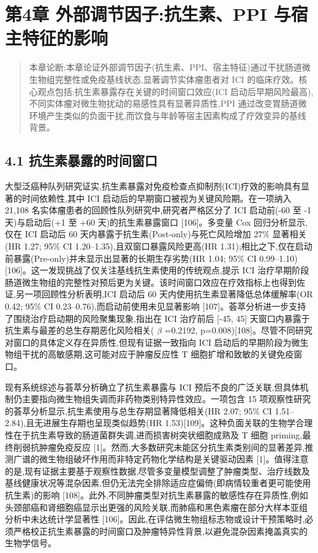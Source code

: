 \documentclass[11pt]{article}
\begin{document}
\section{第4章 外部调节因子:抗生素、PPI 与宿主特征的影响}\label{ux7b2c4ux7ae0-ux5916ux90e8ux8c03ux8282ux56e0ux5b50ux6297ux751fux7d20ppi-ux4e0eux5bbfux4e3bux7279ux5f81ux7684ux5f71ux54cd}

\begin{quote}
本章论断:本章论证外部调节因子(抗生素、PPI、宿主特征)通过干扰肠道微生物组完整性或免疫基线状态,显著调节实体瘤患者对 ICI 的临床疗效。核心观点包括:抗生素暴露存在关键的时间窗口效应(ICI 启动后早期风险最高),不同实体瘤对微生物扰动的易感性具有显著异质性,PPI 通过改变胃肠道微环境产生类似的负面干扰,而饮食与年龄等宿主因素构成了疗效变异的基线背景。
\end{quote}

\subsection{4.1 抗生素暴露的时间窗口}\label{ux6297ux751fux7d20ux66b4ux9732ux7684ux65f6ux95f4ux7a97ux53e3}

大型泛癌种队列研究证实,抗生素暴露对免疫检查点抑制剂(ICI)疗效的影响具有显著的时间依赖性,其中 ICI 启动后的早期窗口被视为关键风险期。在一项纳入 21,108 名实体瘤患者的回顾性队列研究中,研究者严格区分了 ICI 启动前(-60 至 -1 天)与启动后(+1 至 +60 天)的抗生素暴露窗口 {[}106{]}。多变量 Cox 回归分析显示,仅在 ICI 启动后 60 天内暴露于抗生素(Post-only)与死亡风险增加 27\% 显著相关(HR 1.27; 95\% CI 1.20--1.35),且双窗口暴露风险更高(HR 1.31);相比之下,仅在启动前暴露(Pre-only)并未显示出显著的长期生存劣势(HR 1.04; 95\% CI 0.99--1.10){[}106{]}。这一发现挑战了仅关注基线抗生素使用的传统观点,提示 ICI 治疗早期阶段肠道微生物组的完整性对预后更为关键。该时间窗口效应在疗效指标上也得到佐证,另一项回顾性分析表明,ICI 启动后 60 天内使用抗生素显著降低总体缓解率(OR 0.42; 95\% CI 0.23--0.76),而启动前使用未见显著影响 {[}107{]}。荟萃分析进一步支持了围绕治疗启动期的风险聚集现象,指出在 ICI 治疗前后 {[}-45, 45{]} 天窗口内暴露于抗生素与最差的总生存期恶化风险相关( \(\beta\) =0.2192, p=0.008){[}108{]}。尽管不同研究对窗口的具体定义存在异质性,但现有证据一致指向 ICI 启动后的早期阶段为微生物组干扰的高敏感期,这可能对应于肿瘤反应性 T 细胞扩增和致敏的关键免疫窗口。

现有系统综述与荟萃分析确立了抗生素暴露与 ICI 预后不良的广泛关联,但具体机制仍主要指向微生物组失调而非药物类别特异性效应。一项包含 15 项观察性研究的荟萃分析显示,抗生素使用与总生存期显著降低相关(HR 2.07; 95\% CI 1.51--2.84),且无进展生存期也呈现类似趋势(HR 1.53){[}109{]}。这种负面关联的生物学合理性在于抗生素导致的肠道菌群失调,进而损害树突状细胞成熟及 T 细胞 priming,最终削弱抗肿瘤免疫反应 {[}1{]}。然而,大多数研究未能区分抗生素类别间的显著差异,推测广谱的微生物组破坏作用而非特定药物化学结构是关键驱动因素 {[}1{]}。值得注意的是,现有证据主要基于观察性数据,尽管多变量模型调整了肿瘤类型、治疗线数及基线健康状况等混杂因素,但仍无法完全排除适应症偏倚(即病情较重者更可能使用抗生素)的影响 {[}108{]}。此外,不同肿瘤类型对抗生素暴露的敏感性存在异质性,例如头颈部癌和肾细胞癌显示出更强的风险关联,而肺癌和黑色素瘤在部分大样本亚组分析中未达统计学显著性 {[}106{]}。因此,在评估微生物组标志物或设计干预策略时,必须严格校正抗生素暴露的时间窗口及肿瘤特异性背景,以避免混杂因素掩盖真实的生物学信号。
\end{document}
